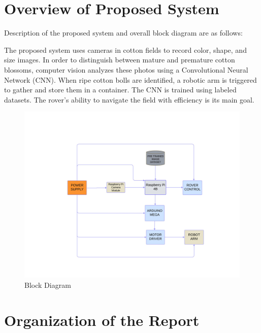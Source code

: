 \documentclass[12pt,a4paper]{report}
\begin{document}


\section {Overview of Proposed System}

\par    Description of the proposed system and overall block diagram are as follows:
\\
\par The proposed system uses cameras in cotton fields to record color, shape, and size images. In order to distinguish between mature and premature cotton blossoms, computer vision analyzes these photos using a Convolutional Neural Network (CNN). When ripe cotton bolls are identified, a robotic arm is triggered to gather and store them in a container. The CNN is trained using labeled datasets. The rover's ability to navigate the field with efficiency is its main goal.\\


\begin{figure}[!htb]
\begin{center}
\includegraphics[scale=0.5]{images/diagrams/blockdig.jpg}
\caption{Block Diagram}
\end{center}
\end{figure}






\section {Organization of the Report}
\end{document}
